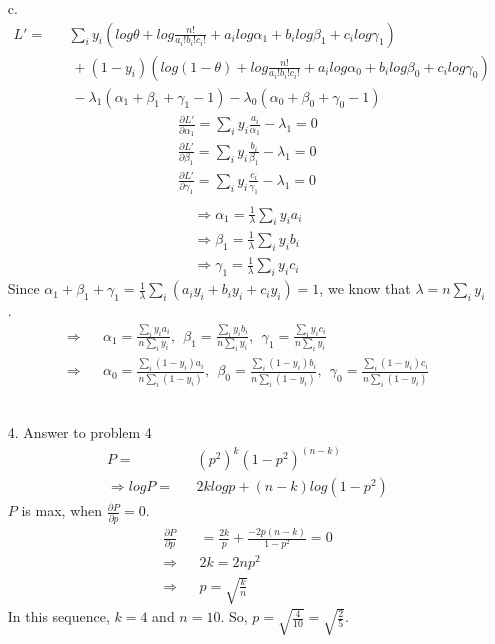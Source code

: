 \begin{enumerate}
\begin{enumerate}
	\item[c.]
		\begin{eqnarray}
		L' = && \sum_{i} y_i (log \theta + log \frac{n!}{a_i!b_i!c_i!} + a_i log \alpha_1 + b_i log \beta_1 + c_i log \gamma_1)\\
		&& \: + (1-y_i) (log (1-\theta) + log \frac{n!}{a_i!b_i!c_i!} + a_i log \alpha_0 + b_i log \beta_0 + c_i log \gamma_0)\\
		&& \: -\lambda_1(\alpha_1 + \beta_1 + \gamma_1 - 1) -\lambda_0(\alpha_0 + \beta_0 + \gamma_0 - 1)
		\end{eqnarray}
		\begin{eqnarray}
		\frac{\partial L'}{\partial \alpha_1} = \sum_i y_i \frac{a_i}{\alpha_1} - \lambda_1 = 0\\
		\frac{\partial L'}{\partial \beta_1} = \sum_i y_i \frac{b_i}{\beta_1} - \lambda_1 = 0\\
		\frac{\partial L'}{\partial \gamma_1} = \sum_i y_i \frac{c_i}{\gamma_1} - \lambda_1 = 0\\
		\end{eqnarray}
		\begin{eqnarray}
		\Rightarrow \alpha_1 = \frac{1}{\lambda} \sum_i y_i a_i\\
		\Rightarrow \beta_1 = \frac{1}{\lambda} \sum_i y_i b_i\\
		\Rightarrow \gamma_1 = \frac{1}{\lambda} \sum_i y_i c_i
		\end{eqnarray}
		Since $\alpha_1 + \beta_1 + \gamma_1 = \frac{1}{\lambda} \sum_i (a_iy_i + b_iy_i + c_iy_i) = 1$, we know that $\lambda = n \sum_i y_i$.
		\begin{eqnarray}
		\Rightarrow && \alpha_1 = \frac{\sum_i y_i a_i}{n \sum_i y_i}, \:\: \beta_1 = \frac{\sum_i y_i b_i}{n \sum_i y_i}, \:\: \gamma_1 = \frac{\sum_i y_i c_i}{n \sum_i y_i}\\
		\Rightarrow && \alpha_0 = \frac{\sum_i (1-y_i) a_i}{n \sum_i (1-y_i)}, \:\: \beta_0 = \frac{\sum_i (1-y_i) b_i}{n \sum_i (1-y_i)}, \:\: \gamma_0 = \frac{\sum_i (1-y_i) c_i}{n \sum_i (1-y_i)}
		\end{eqnarray}
		\\
\item[4.] Answer to problem 4
		\begin{eqnarray}
		P = && (p^2)^k (1-p^2)^(n-k)\\
		\Rightarrow logP = && 2klogp + (n-k)log(1-p^2)
		\end{eqnarray}
		$P$ is max, when $\frac{\partial P}{\partial p} = 0$.
		\begin{eqnarray}
		\frac{\partial P}{\partial p} && = \frac{2k}{p} + \frac{-2p(n-k)}{1-p^2} = 0\\
		\Rightarrow && 2k = 2np^2 \\
		\Rightarrow && p = \sqrt{\frac{k}{n}}
		\end{eqnarray}
		In this sequence, $k = 4$ and $n = 10$. So, $p = \sqrt{\frac{4}{10}} = \sqrt{\frac{2}{5}}$. 
	\end{enumerate}
\end{enumerate}



